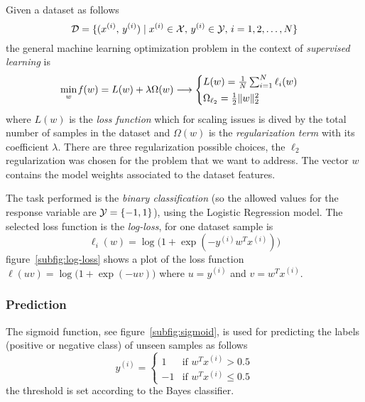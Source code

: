 Given a dataset as follows
\[
\mathcal{D}=\{(x^{(i)},\,y^{(i)})\mid x^{(i)}\in\mathcal{X},\,y^{(i)}\in\mathcal{Y},\,i=1,2,\dots,N\}
\]
the general machine learning optimization problem in the context of \emph{supervised learning} is
\[
\min_{w}\operatorname*{\mathit{f}}(w)=L(w)+\lambda\Omega(w)\longrightarrow
\begin{cases}
L(w)=\frac{1}{N}\sum_{i=1}^N\ell_i(w) \\[0.5ex]
\Omega_{\ell_2}=\frac{1}{2}\lVert w\rVert_2^2
\end{cases}
\]
where $L(w)$ is the \emph{loss function} which for scaling issues is dived by the total number of samples in the dataset and $\Omega(w)$ is the \emph{regularization term} with its coefficient $\lambda$. There are three regularization possible choices, the $\ell_2$ regularization was chosen for the problem that we want to address. The vector $w$ contains the model weights associated to the dataset features.

The task performed is the \emph{binary classification} (so the allowed values for the response variable are $\mathcal{Y}=\{-1,1\}$), using the Logistic Regression model. The selected loss function is the \emph{log-loss}, for one dataset sample is
\begin{equation}\label{eq:sample_loss}
\ell_i(w)=\log\bigl(1+\exp(-y^{(i)}w^Tx^{(i)})\bigr)
\end{equation}
figure~\vref{subfig:log-loss} shows a plot of the loss function $\ell(uv)=\log\bigl(1+\exp(-uv)\bigr)$ where $u=y^{(i)}$ and $v=w^Tx^{(i)}$.

\subsubsection*{Prediction}

The sigmoid function, see figure~\vref{subfig:sigmoid}, is used for predicting the labels (positive or negative class) of unseen samples as follows
\[
y^{(i)}=
\begin{cases}
1  & \text{if $w^Tx^{(i)}>0.5$} \\
-1 & \text{if $w^Tx^{(i)}\leq0.5$}
\end{cases}
\]
the threshold is set according to the Bayes classifier.

